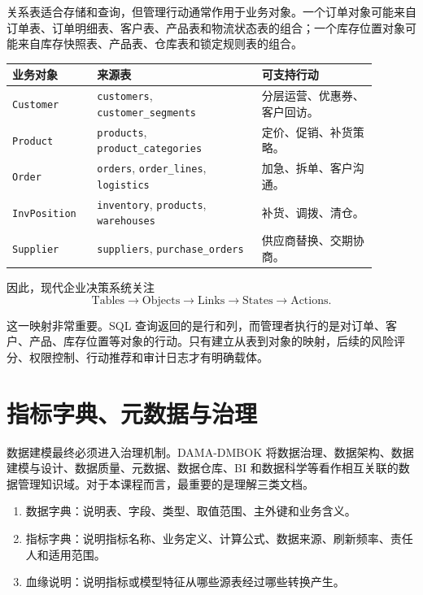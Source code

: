 \documentclass[UTF8,fontset=fandol,openany,zihao=-4]{ctexbook}
\begin{document}
关系表适合存储和查询，但管理行动通常作用于业务对象。一个订单对象可能来自订单表、订单明细表、客户表、产品表和物流状态表的组合；一个库存位置对象可能来自库存快照表、产品表、仓库表和锁定规则表的组合。

\begin{center}
\captionsetup{type=table,hypcap=false}
\caption{关系表到业务对象的映射}
\begin{tabular}{p{0.20\linewidth}p{0.40\linewidth}p{0.29\linewidth}}
\toprule
业务对象 & 来源表 & 可支持行动\\
\midrule
\texttt{Customer} & \texttt{customers}, \texttt{customer\_segments} & 分层运营、优惠券、客户回访。\\
\texttt{Product} & \texttt{products}, \texttt{product\_categories} & 定价、促销、补货策略。\\
\texttt{Order} & \texttt{orders}, \texttt{order\_lines}, \texttt{logistics} & 加急、拆单、客户沟通。\\
\texttt{InvPosition} & \texttt{inventory}, \texttt{products}, \texttt{warehouses} & 补货、调拨、清仓。\\
\texttt{Supplier} & \texttt{suppliers}, \texttt{purchase\_orders} & 供应商替换、交期协商。\\
\bottomrule
\end{tabular}
\end{center}

因此，现代企业决策系统关注
\[
\text{Tables}\rightarrow\text{Objects}\rightarrow\text{Links}\rightarrow\text{States}\rightarrow\text{Actions}.
\]

这一映射非常重要。SQL 查询返回的是行和列，而管理者执行的是对订单、客户、产品、库存位置等对象的行动。只有建立从表到对象的映射，后续的风险评分、权限控制、行动推荐和审计日志才有明确载体。

\section{指标字典、元数据与治理}

数据建模最终必须进入治理机制。DAMA-DMBOK 将数据治理、数据架构、数据建模与设计、数据质量、元数据、数据仓库、BI 和数据科学等看作相互关联的数据管理知识域。对于本课程而言，最重要的是理解三类文档。

\begin{enumerate}
  \item 数据字典：说明表、字段、类型、取值范围、主外键和业务含义。
  \item 指标字典：说明指标名称、业务定义、计算公式、数据来源、刷新频率、责任人和适用范围。
  \item 血缘说明：说明指标或模型特征从哪些源表经过哪些转换产生。
\end{enumerate}
\end{document}
